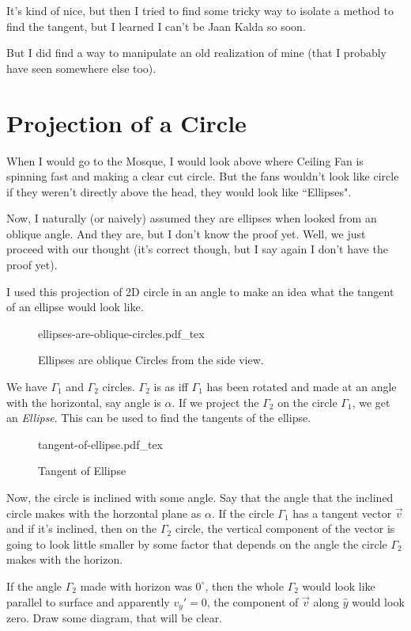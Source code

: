 \documentclass[11pt,a4paper]{article}
\newcommand{\incfig}[1]{%
    \def\svgwidth{0.7\columnwidth}
    {#1.pdf_tex}
}
\begin{document}
It's kind of nice, but then I tried to find some tricky way to isolate a method to find the tangent, but I learned I can't be Jaan Kalda so soon.

But I did find a way to manipulate an old realization of mine (that I probably have seen somewhere else too).


\newpage 
\section{ Projection of a Circle }
When I would go to the Mosque, I would look above where Ceiling Fan is spinning fast and making a clear cut circle. But the fans wouldn't look like circle if they weren't directly above the head, they would look like ``Ellipses".

Now, I naturally (or naively) assumed they are ellipses when looked from an oblique angle. And they are, but I don't know the proof yet. Well, we just proceed with our thought (it's correct though, but I say again I don't have the proof yet). 

I used this projection of 2D circle in an angle to make an idea what the tangent of an ellipse would look like.
\begin{figure}[ht]
    \centering
    \incfig{ellipses-are-oblique-circles}
    \caption{Ellipses are oblique Circles from the side view.}
    \label{fig:ellipses-are-oblique-circles}
\end{figure}
We have $\Gamma_1$ and $\Gamma_2$ circles. $\Gamma_2$ is as iff $\Gamma_1$ has been rotated and made at an angle with the horizontal, say angle is $\alpha$. If we project the $\Gamma_2$ on the circle $\Gamma_1$, we get an \emph{Ellipse}. 
This can be used to find the tangents of the ellipse.

\begin{figure}[ht]
    \centering
    \incfig{tangent-of-ellipse}
    \caption{Tangent of Ellipse}
    \label{fig:tangent-of-ellipse}
\end{figure}

Now, the circle is inclined with some angle. Say that the angle that the inclined circle makes with the horzontal plane as $\alpha$. If the circle $\Gamma_1$ has a tangent vector $\vec{v}$ and if it's inclined, then on the $\Gamma_2$ circle, the vertical component of the vector is going to look little smaller by some factor that depends on the angle the circle $\Gamma_{2}$ makes with the horizon. 

If the angle $\Gamma_2$ made with horizon was $0^{\circ}$, then the whole $\Gamma_2$ would look like parallel to surface and apparently $v_y' = 0$, the component of $\vec{v}$ along $\hat{y}$ would look zero. Draw some diagram, that will be clear.
\end{document}
